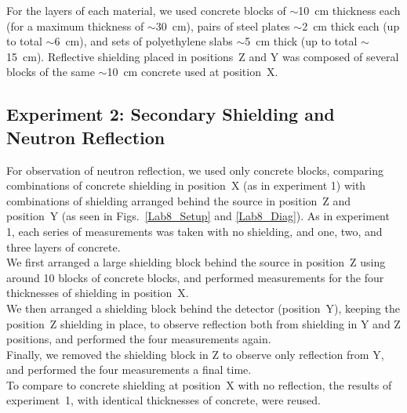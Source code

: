\documentclass[12pt]{article}
\begin{document}
For the layers of each material, we used concrete blocks of $\sim$10~cm thickness each (for a maximum thickness of $\sim$30~cm), pairs of steel plates $\sim$2~cm thick each (up to total $\sim$6~cm), and sets of polyethylene slabs $\sim$5~cm thick (up to total $\sim$15~cm). Reflective shielding placed in positions~Z and Y was composed of several blocks of the same $\sim$10~cm concrete used at position~X.

\subsection{Experiment 2: Secondary Shielding and Neutron Reflection}
For observation of neutron reflection, we used only concrete blocks, comparing combinations of concrete shielding in position~X (as in experiment 1) with combinations of shielding arranged behind the source in position~Z and position~Y (as seen in Figs.~\ref{Lab8_Setup} and \ref{Lab8_Diag}).
As in experiment 1, each series of measurements was taken with no shielding, and one, two, and three layers of concrete.\\

We first arranged a large shielding block behind the source in position~Z using around 10 blocks of concrete blocks, and performed measurements for the four thicknesses of shielding in position~X.\\

We then arranged a shielding block behind the detector (position~Y), keeping the position~Z shielding in place, to observe reflection both from shielding in Y and Z positions, and performed the four measurements again.\\

Finally, we removed the shielding block in Z to observe only reflection from Y, and performed the four measurements a final time.\\

To compare to concrete shielding at position~X with no reflection, the results of experiment~1, with identical thicknesses of concrete, were reused.

    
\end{document}
